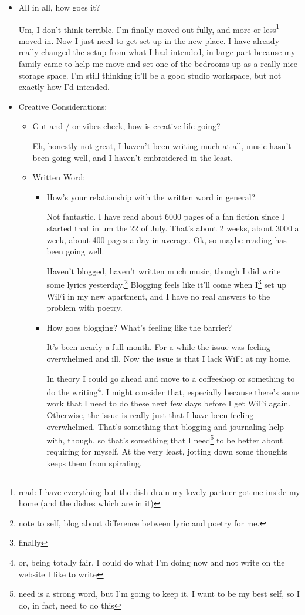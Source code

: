 \documentclass[12pt]{article}
\renewcommand{\,}{\textsuperscript{,}}
\begin{document}
\begin{itemize}

\item All in all, how goes it?

Um, I don't think terrible.
I'm finally moved out fully, and more or less\footnote{read: I have everything but the dish drain my lovely partner got me inside my home (and the dishes which are in it)} moved in.
Now I just need to get set up in the new place.
I have already really changed the setup from what I had intended, in large part because my family came to help me move and set one of the bedrooms up as a really nice storage space. I'm still thinking it'll be a good studio workspace, but not exactly how I'd intended.

\item Creative Considerations:

\begin{itemize}

\item Gut and / or vibes check, how is creative life going?

Eh, honestly not great, I haven't been writing much at all, music hasn't been going well, and I haven't embroidered in the least.

\item Written Word:

\begin{itemize}

\item How's your relationship with the written word in general?

Not fantastic.
I have read about 6000 pages of a fan fiction since I started that in um the 22 of July.
That's about 2 weeks, about 3000 a week, about 400 pages a day in average.
Ok, so maybe reading has been going well.

Haven't blogged, haven't written much music, though I did write some lyrics yesterday.\footnote{note to self, blog about difference between lyric and poetry for me.}
Blogging feels like it'll come when I\footnote{finally} set up WiFi in my new apartment, and I have no real answers to the problem with poetry.

\item How goes blogging? What's feeling like the barrier?

It's been nearly a full month.
For a while the issue was feeling overwhelmed and ill.
Now the issue is that I lack WiFi at my home. 

In theory I could go ahead and move to a coffeeshop or something to do the writing\footnote{or, being totally fair, I could do what I'm doing now and not write on the website I like to write}.
I might consider that, especially because there's some work that I need to do these next few days before I get WiFi again.
Otherwise, the issue is really just that I have been feeling overwhelmed.
That's something that blogging and journaling help with, though, so that's something that I need\footnote{need is a strong word, but I'm going to keep it. I want to be my best self, so I do, in fact, need to do this} to be better about requiring for myself.
At the very least, jotting down some thoughts keeps them from spiraling.


\end{itemize}
\end{itemize}
\end{itemize}
\end{document}

